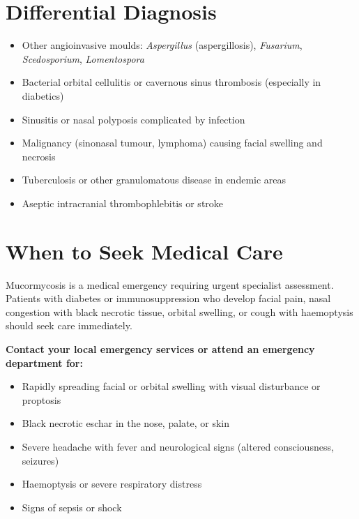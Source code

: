 \section*{Differential Diagnosis}
\begin{itemize}
    \item Other angioinvasive moulds: \textit{Aspergillus} (aspergillosis), \textit{Fusarium}, \textit{Scedosporium}, \textit{Lomentospora}
    \item Bacterial orbital cellulitis or cavernous sinus thrombosis (especially in diabetics)
    \item Sinusitis or nasal polyposis complicated by infection
    \item Malignancy (sinonasal tumour, lymphoma) causing facial swelling and necrosis
    \item Tuberculosis or other granulomatous disease in endemic areas
    \item Aseptic intracranial thrombophlebitis or stroke
\end{itemize}

\section*{When to Seek Medical Care}
Mucormycosis is a medical emergency requiring urgent specialist assessment. Patients with diabetes or immunosuppression who develop facial pain, nasal congestion with black necrotic tissue, orbital swelling, or cough with haemoptysis should seek care immediately.

\textbf{Contact your local emergency services or attend an emergency department for:}
\begin{itemize}
    \item Rapidly spreading facial or orbital swelling with visual disturbance or proptosis
    \item Black necrotic eschar in the nose, palate, or skin
    \item Severe headache with fever and neurological signs (altered consciousness, seizures)
    \item Haemoptysis or severe respiratory distress
    \item Signs of sepsis or shock
\end{itemize}


